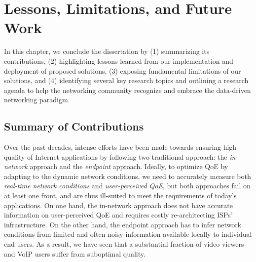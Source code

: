 \chapter{Lessons, Limitations, and Future Work}
\label{ch:concl}


In this chapter, we conclude the dissertation by 
(1) summarizing its contributions, 
(2) highlighting lessons learned from our implementation and 
deployment of proposed solutions, 
(3) exposing fundamental limitations of our solutions, and
(4) identifying several key research topics and outlining a 
research agenda to help the networking community recognize 
and embrace the data-driven networking paradigm.

\section{Summary of Contributions}

Over the past decades, intense efforts have been made towards
ensuring high quality of Internet applications by following two 
traditional approach: the {\em in-network} approach and 
the {\em endpoint} approach.
Ideally, to optimize QoE by adapting to the dynamic network conditions,
we need to accurately measure both {\em real-time network 
conditions} and {\em user-perceived QoE}, but both approaches fail
on at least one front, and are thus ill-suited to meet the 
requirements of today's applications. 
On one hand, the in-network approach does not have accurate 
information on user-perceived QoE and requires costly 
re-architecting ISPs' infrastructure.
On the other hand, the endpoint approach has to infer network
conditions from limited and often noisy information available locally
to individual end users.
As a result, we have seen that a substantial fraction of video 
viewers and VoIP users suffer from suboptimal quality.

